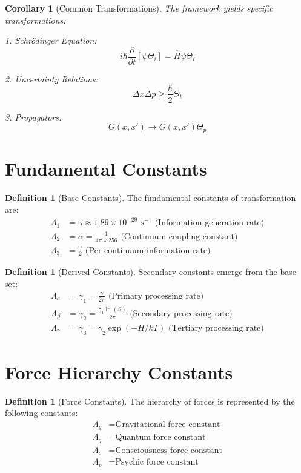 \documentclass{article}
\theoremstyle{plain}
\newtheorem{corollary}[theorem]{Corollary}
\theoremstyle{definition}
\newtheorem{definition}[theorem]{Definition}
\theoremstyle{remark}
\begin{document}
\begin{corollary}[Common Transformations]
The framework yields specific transformations:

1. Schrödinger Equation:
\[i\hbar\frac{\partial}{\partial t}[\psi\Theta_i] = \hat{H}\psi\Theta_i\]

2. Uncertainty Relations:
\[\Delta x\Delta p \geq \frac{\hbar}{2}\Theta_t\]

3. Propagators:
\[G(x,x') \rightarrow G(x,x')\Theta_p\]
\end{corollary}

\section{Fundamental Constants}

\begin{definition}[Base Constants]
The fundamental constants of transformation are:
\begin{align*}
\Lambda_1 &= \gamma \approx 1.89 \times 10^{-29} \text{ s}^{-1} \text{ (Information generation rate)} \\
\Lambda_2 &= \alpha = \frac{1}{4\pi \times 256} \text{ (Continuum coupling constant)} \\
\Lambda_3 &= \frac{\gamma}{2} \text{ (Per-continuum information rate)}
\end{align*}
\end{definition}

\begin{definition}[Derived Constants]
Secondary constants emerge from the base set:
\begin{align*}
\Lambda_a &= \gamma_1 = \frac{\gamma}{2\pi} \text{ (Primary processing rate)} \\
\Lambda_\beta &= \gamma_2 = \frac{\gamma_1\ln(S)}{2\pi} \text{ (Secondary processing rate)} \\
\Lambda_\gamma &= \gamma_3 = \gamma_2\exp(-H/kT) \text{ (Tertiary processing rate)}
\end{align*}
\end{definition}

\section{Force Hierarchy Constants}

\begin{definition}[Force Constants]
The hierarchy of forces is represented by the following constants:
\begin{align*}
\Lambda_g &= \text{Gravitational force constant} \\
\Lambda_q &= \text{Quantum force constant} \\
\Lambda_c &= \text{Consciousness force constant} \\
\Lambda_p &= \text{Psychic force constant}
\end{align*}
\end{definition}
\end{document}
